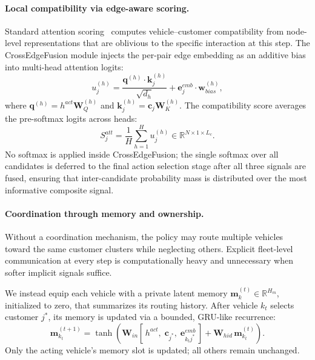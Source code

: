 \paragraph{Local compatibility via edge-aware scoring.}
Standard attention scoring~\cite{kool2019attention} computes vehicle--customer compatibility from node-level representations that are oblivious to the specific interaction at this step.
The CrossEdgeFusion module injects the per-pair edge embedding as an additive bias into multi-head attention logits:
\[
u_j^{(h)} = \frac{\mathbf{q}^{(h)} \cdot \mathbf{k}_j^{(h)}}{\sqrt{d_h}} + \mathbf{e}_j^{emb} \cdot \mathbf{w}_{bias}^{(h)},
\]
where $\mathbf{q}^{(h)} = h^{act}\mathbf{W}_Q^{(h)}$ and $\mathbf{k}_j^{(h)} = \mathbf{c}_j\mathbf{W}_K^{(h)}$.
The compatibility score averages the pre-softmax logits across heads:
\[
S^{att}_j = \frac{1}{H}\sum_{h=1}^{H} u_j^{(h)} \in \mathbb{R}^{N \times 1 \times L_c}.
\]
No softmax is applied inside CrossEdgeFusion; the single softmax over all candidates is deferred to the final action selection stage after all three signals are fused, ensuring that inter-candidate probability mass is distributed over the most informative composite signal.

\paragraph{Coordination through memory and ownership.}
Without a coordination mechanism, the policy may route multiple vehicles toward the same customer clusters while neglecting others.
Explicit fleet-level communication at every step is computationally heavy and unnecessary when softer implicit signals suffice.

We instead equip each vehicle with a private latent memory $\mathbf{m}_k^{(t)} \in \mathbb{R}^{H_m}$, initialized to zero, that summarizes its routing history.
After vehicle $k_t$ selects customer $j^*$, its memory is updated via a bounded, GRU-like recurrence:
\[
\mathbf{m}_{k_t}^{(t+1)} = \tanh\!\left(\mathbf{W}_{in}\!\left[\,h^{act},\;\mathbf{c}_{j^*},\;\mathbf{e}_{k_t j^*}^{emb}\,\right] + \mathbf{W}_{hid}\,\mathbf{m}_{k_t}^{(t)}\right).
\]
Only the acting vehicle's memory slot is updated; all others remain unchanged.

